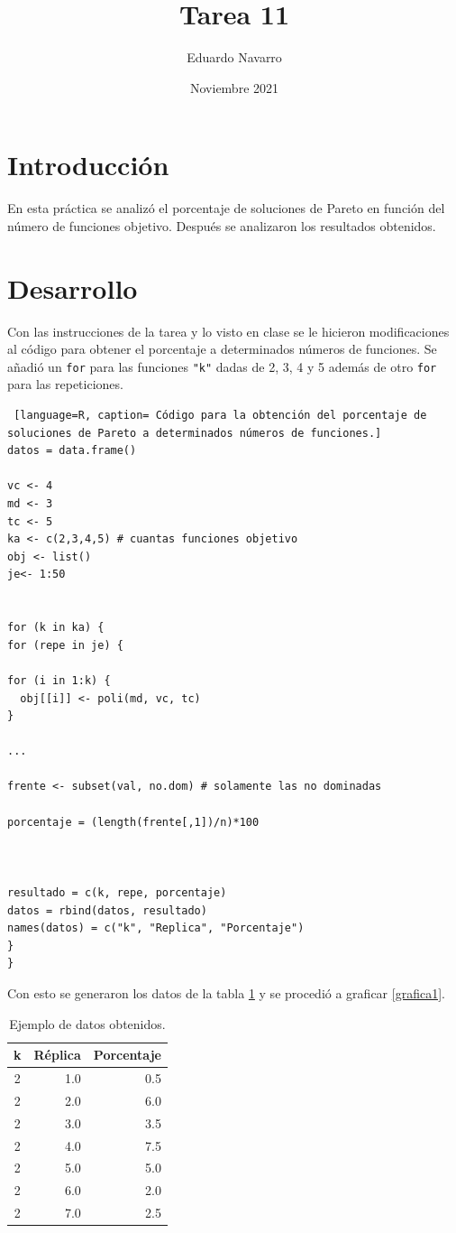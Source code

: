 \documentclass{article}
\title{Tarea 11}
\author{Eduardo Navarro}
\date{Noviembre 2021}
\begin{document}
\maketitle

\section{Introducción}
En esta práctica se analizó el porcentaje de soluciones de Pareto en función del número de funciones objetivo. Después se analizaron los resultados obtenidos.

\section{Desarrollo}
Con las instrucciones de la tarea \cite{pareto} y lo visto en clase \cite{twitchsimu} se le hicieron modificaciones al código para obtener el porcentaje a determinados números de funciones. Se añadió un \texttt{for} para las funciones \texttt{"k"} dadas de 2, 3, 4 y 5 además de otro \texttt{for} para las repeticiones.

\begin{lstlisting} [language=R, caption= Código para la obtención del porcentaje de soluciones de Pareto a determinados números de funciones.] 
datos = data.frame()

vc <- 4
md <- 3
tc <- 5
ka <- c(2,3,4,5) # cuantas funciones objetivo
obj <- list()
je<- 1:50


for (k in ka) {
for (repe in je) {

for (i in 1:k) {
  obj[[i]] <- poli(md, vc, tc)
}

...

frente <- subset(val, no.dom) # solamente las no dominadas

porcentaje = (length(frente[,1])/n)*100



resultado = c(k, repe, porcentaje)
datos = rbind(datos, resultado)
names(datos) = c("k", "Replica", "Porcentaje")
}
}
\end{lstlisting}
 Con esto se generaron los datos de la tabla \ref{tabla1} y se procedió a graficar \ref{grafica1}.
 
 \begin{table}[h!]
\centering
\caption{Ejemplo de datos obtenidos.}
\label{tabla1}
\begin{tabular}{|c|r|r|}
\hline
\textbf{k} & \multicolumn{1}{c|}{\textbf{Réplica}} & \multicolumn{1}{c|}{\textbf{Porcentaje}} \\ \hline
2 & 1.0 & 0.5 \\ \hline
2 & 2.0 & 6.0 \\ \hline
2 & 3.0 & 3.5 \\ \hline
2 & 4.0 & 7.5 \\ \hline
2 & 5.0 & 5.0 \\ \hline
2 & 6.0 & 2.0 \\ \hline
2 & 7.0 & 2.5 \\ \hline
\end{tabular}
\end{table}
\end{document}

